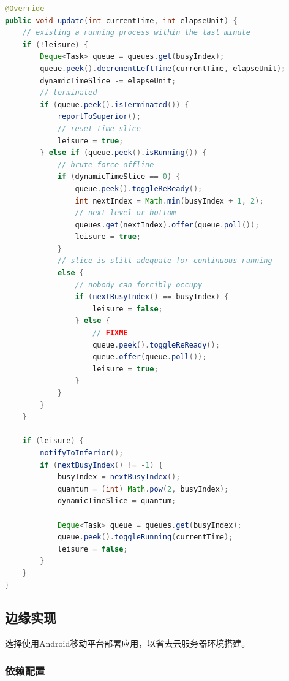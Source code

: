 \documentclass[12pt, a4paper, UTF8]{ctexart}
\begin{document}
\begin{lstlisting}[language={java},caption={多级反馈队列（抢占式调度）}]
@Override
public void update(int currentTime, int elapseUnit) {
    // existing a running process within the last minute
    if (!leisure) {
        Deque<Task> queue = queues.get(busyIndex);
        queue.peek().decrementLeftTime(currentTime, elapseUnit);
        dynamicTimeSlice -= elapseUnit;
        // terminated
        if (queue.peek().isTerminated()) {
            reportToSuperior();
            // reset time slice
            leisure = true;
        } else if (queue.peek().isRunning()) {
            // brute-force offline
            if (dynamicTimeSlice == 0) {
                queue.peek().toggleReReady();
                int nextIndex = Math.min(busyIndex + 1, 2);
                // next level or bottom
                queues.get(nextIndex).offer(queue.poll());
                leisure = true;
            }
            // slice is still adequate for continuous running
            else {
                // nobody can forcibly occupy
                if (nextBusyIndex() == busyIndex) {
                    leisure = false;
                } else {
                    // FIXME
                    queue.peek().toggleReReady();
                    queue.offer(queue.poll());
                    leisure = true;
                }
            }
        }
    }

    if (leisure) {
        notifyToInferior();
        if (nextBusyIndex() != -1) {
            busyIndex = nextBusyIndex();
            quantum = (int) Math.pow(2, busyIndex);
            dynamicTimeSlice = quantum;

            Deque<Task> queue = queues.get(busyIndex);
            queue.peek().toggleRunning(currentTime);
            leisure = false;
        }
    }
}
\end{lstlisting}

\subsection{边缘实现}

选择使用Android移动平台部署应用，以省去云服务器环境搭建。

\subsubsection{依赖配置}
\end{document}
